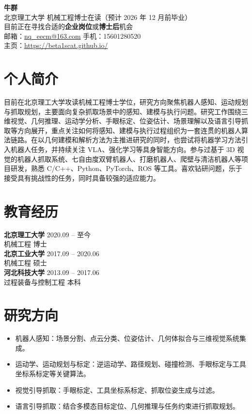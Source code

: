 \documentclass[11pt,a4paper]{article}
\newcommand{\entry}[4]{%
  \textbf{#1} \hfill #2\\
  {\color{textgray}#3} \hfill {#4}\\[-2pt]
}
\begin{document}
{\LARGE\bfseries\color{titlecolor} 牛群}\\[4pt]
北京理工大学 \quad 机械工程博士在读（预计 2026 年 12 月前毕业）\\
目前正在寻找合适的\textbf{企业岗位}或\textbf{博士后}机会\\
邮箱：\href{mailto:nq_eecm@163.com}{nq\_eecm@163.com} \quad 手机：15601280520\\
主页：\href{https://beta1scat.github.io/}{https://beta1scat.github.io/}

\section*{个人简介}
目前在北京理工大学攻读机械工程博士学位，研究方向聚焦机器人感知、运动规划与抓取规划，主要面向复杂抓取场景中的感知、建模与执行问题。研究工作围绕三维视觉、几何推理、运动学分析、手眼标定、位姿估计、场景理解以及语言引导抓取等方向展开，重点关注如何将感知、建模与执行过程组织为一套连贯的机器人算法链路。在以几何建模和解析方法为主推进研究的同时，也尝试将机器学习方法引入机器人任务，并持续关注 VLA、强化学习等具身智能方向。参与过基于 3D 视觉的机器人抓取系统、七自由度双臂机器人、打磨机器人、爬壁与清洁机器人等项目研发，熟悉 C/C++、Python、PyTorch、ROS 等工具。喜欢钻研问题，乐于接受具有挑战性的任务，同时具备较强的适应能力。

\section*{教育经历}
\entry{北京理工大学}{2020.09 -- 至今}{机械工程}{博士}
\entry{北京工业大学}{2017.09 -- 2020.06}{机械工程}{硕士}
\entry{河北科技大学}{2013.09 -- 2017.06}{过程装备与控制工程}{本科}

\section*{研究方向}
\begin{itemize}
	\item 机器人感知：场景分割、点云分类、位姿估计、几何体拟合与三维视觉系统集成。
	\item 运动学、运动规划与标定：逆运动学、路径规划、碰撞检测、手眼标定与工具坐标系标定等关键算法。
	\item 视觉引导抓取：手眼标定、工具坐标系标定、抓取位姿生成与过滤。
	\item 语言引导抓取：结合多模态目标定位、几何推理与任务约束进行抓取规划。
\end{itemize}
\end{document}

